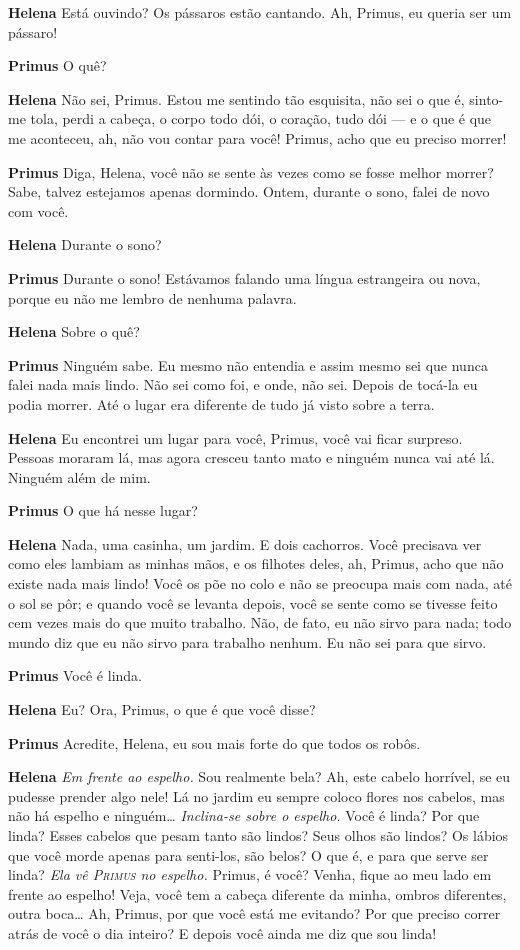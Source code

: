 \textbf{Helena} Está ouvindo? Os pássaros estão cantando. Ah, Primus, eu queria ser um
pássaro!

\textbf{Primus} O quê?

\textbf{Helena} Não sei, Primus. Estou me sentindo tão esquisita, não sei o que é,
sinto-me tola, perdi a cabeça, o corpo todo dói, o coração, tudo dói --- e
o que é que me aconteceu, ah, não vou contar para você! Primus, acho que eu
preciso morrer!

\textbf{Primus} Diga, Helena, você não se sente às vezes como se fosse melhor morrer?
Sabe, talvez estejamos apenas dormindo. Ontem, durante o sono, falei de novo com
você.

\textbf{Helena} Durante o sono?

\textbf{Primus} Durante o sono! Estávamos falando uma língua estrangeira ou nova, porque
eu não me lembro de nenhuma palavra.

\textbf{Helena} Sobre o quê?

\textbf{Primus} Ninguém sabe. Eu mesmo não entendia e assim mesmo sei que nunca falei
nada mais lindo. Não sei como foi, e onde, não sei. Depois de tocá-la eu podia
morrer. Até o lugar era diferente de tudo já visto sobre a terra.

\textbf{Helena} Eu encontrei um lugar para você, Primus, você vai ficar surpreso. Pessoas moraram
lá, mas agora cresceu tanto mato e ninguém nunca vai até lá. Ninguém além de mim.

\textbf{Primus} O que há nesse lugar?

\textbf{Helena} Nada, uma casinha, um jardim. E dois cachorros. Você precisava ver
como eles lambiam as minhas mãos, e os filhotes deles, ah, Primus, acho que não
existe nada mais lindo! Você os põe no colo e não se preocupa mais com nada, até
o sol se pôr; e quando você se levanta depois, você se sente como se tivesse
feito cem vezes mais do que muito trabalho. Não, de fato, eu não sirvo para
nada; todo mundo diz que eu não sirvo para trabalho nenhum. Eu não sei para que sirvo.

\textbf{Primus} Você é linda.

\textbf{Helena} Eu? Ora, Primus, o que é que você disse?

\textbf{Primus} Acredite, Helena, eu sou mais forte do que todos os robôs.

\textbf{Helena} \emph{Em frente ao espelho.} Sou realmente bela? Ah, este cabelo
horrível, se eu pudesse prender algo nele! Lá no jardim eu
sempre coloco flores nos cabelos, mas não há espelho e ninguém\ldots{}
\emph{Inclina-se sobre o espelho.} Você é linda? Por que linda? Esses
cabelos que pesam tanto são lindos? Seus olhos são lindos? Os
lábios que você morde apenas para senti-los, são belos? O que é, e para que serve
ser linda? \emph{Ela vê \textsc{Primus} no espelho.} Primus, é você? Venha, fique ao
meu lado em frente ao espelho! Veja, você tem a cabeça diferente da minha,
ombros diferentes, outra boca\ldots{} Ah, Primus, por que você está me evitando? Por
que preciso correr atrás de você o dia inteiro? E depois você ainda me diz que sou linda!

